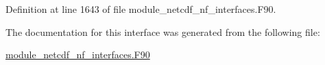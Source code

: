 Definition at line 1643 of file module\+\_\+netcdf\+\_\+nf\+\_\+interfaces.\+F90.



The documentation for this interface was generated from the following file\+:\begin{DoxyCompactItemize}
\item 
\hyperlink{module__netcdf__nf__interfaces_8F90}{module\+\_\+netcdf\+\_\+nf\+\_\+interfaces.\+F90}\end{DoxyCompactItemize}
